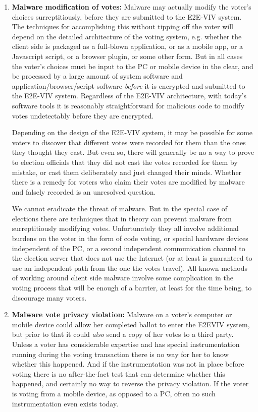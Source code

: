 \begin{enumerate}[label={\roman*})]
\item \textbf{Malware modification of votes:} Malware may actually
  modify the voter’s choices surreptitiously, before they are
  submitted to the E2E-VIV system. The techniques for accomplishing
  this without tipping off the voter will depend on the detailed
  architecture of the voting system, e.g. whether the client side is
  packaged as a full-blown application, or as a mobile app, or a
  Javascript script, or a browser plugin, or some other form. But in
  all cases the voter’s choices must be input to the PC or mobile
  device in the clear, and be processed by a large amount of system
  software and application/browser/script software \emph{before} it is
  encrypted and submitted to the E2E-VIV system. Regardless of the
  E2E-VIV architecture, with today’s software tools it is reasonably
  straightforward for malicious code to modify votes undetectably
  before they are encrypted.

  Depending on the design of the E2E-VIV system, it may be possible
  for some voters to discover that different votes were recorded for
  them than the ones they thought they cast. But even so, there will
  generally be no a way to prove to election officials that they did
  not cast the votes recorded for them by mistake, or cast them
  deliberately and just changed their minds. Whether there is a remedy
  for voters who claim their votes are modified by malware and falsely
  recorded is an unresolved question.

  We cannot eradicate the threat of malware. But in the special case
  of elections there are techniques that in theory can prevent malware
  from surreptitiously modifying votes. Unfortunately they all involve
  additional burdens on the voter in the form of code voting, or
  special hardware devices independent of the PC, or a second
  independent communication channel to the election server that does
  not use the Internet (or at least is guaranteed to use an
  independent path from the one the votes travel). All known methods
  of working around client side malware involve some complication in
  the voting process that will be enough of a barrier, at least for
  the time being, to discourage many voters.

\item \textbf{Malware vote privacy violation:} Malware on a voter’s
  computer or mobile device could allow her completed ballot to enter
  the E2EVIV system, but prior to that it could \emph{also} send a
  copy of her votes to a third party. Unless a voter has considerable
  expertise and has special instrumentation running during the voting
  transaction there is no way for her to know whether this
  happened. And if the instrumentation was not in place before voting
  there is no after-the-fact test that can determine whether this
  happened, and certainly no way to reverse the privacy violation. If
  the voter is voting from a mobile device, as opposed to a PC, often
  no such instrumentation even exists today.


\end{enumerate}
